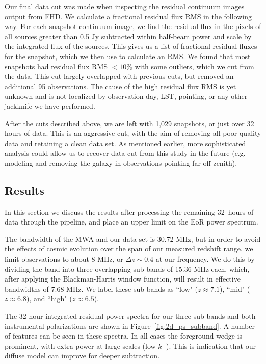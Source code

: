 \documentclass[iop]{emulateapj}
\begin{document}
Our final data cut was made when inspecting the residual continuum images output from 
FHD. We calculate a fractional residual flux RMS in the following way. For each snapshot 
continuum image, we find the residual flux in the pixels of all sources greater than 0.5 Jy 
subtracted within half-beam power and scale by the integrated flux of the sources. This 
gives us a list of fractional residual fluxes for the snapshot, which we then use to calculate 
an RMS. We found that most snapshots had residual flux RMS $<10\%$ with some outliers, 
which we cut from the data. This cut largely overlapped with previous cuts, but removed an 
additional 95 observations. The cause of the high residual flux RMS is yet unknown and is 
not localized by observation day, LST, pointing, or any other jackknife we have performed.

After the cuts described above, we are left with 1,029 snapshots, or just over 32 hours of 
data. This is an aggressive cut, with the aim of removing all poor quality data and retaining 
a clean data set. As mentioned earlier, more sophisticated analysis could allow us to 
recover data cut from this study in the future (e.g. modeling and removing the galaxy in 
observations pointing far off zenith).

\subsection{Results}\label{sec:results}

In this section we discuss the results after processing the remaining 32~hours of data 
through the \eppsilon pipeline, and place an upper limit on the EoR power spectrum.

The bandwidth of the MWA and our data set is 30.72 MHz, but in order to avoid the effects 
of cosmic evolution over the span of our measured redshift range, we limit observations to 
about 8 MHz, or $\Delta z \sim 0.4$ at our frequency. We do this by dividing the band into 
three overlapping sub-bands of 15.36 MHz each, which, after applying the Blackman-Harris 
window function, will result in effective bandwidths of 7.68 MHz. We label these sub-bands 
as ``low" ($z\approx 7.1$), ``mid" ($z\approx 6.8$), and ``high" ($z\approx 6.5$).

The 32 hour integrated residual power spectra for our three sub-bands and both 
instrumental polarizations are shown in Figure~\ref{fig:2d_ps_subband}. A number of 
features can be seen in these spectra. In all cases the foreground wedge is prominent, with 
extra power at large scales (low $k_{\perp}$). This is indication that our diffuse model can 
improve for deeper subtraction. 
\end{document}
